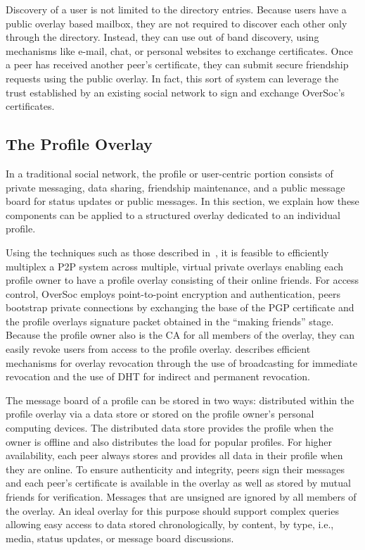 \documentclass{IEEEtran}
\begin{document}
Discovery of a user is not limited to the directory entries.  Because users
have a public overlay based mailbox, they are not required to discover each
other only through the directory.  Instead, they can use out of band discovery,
using mechanisms like e-mail, chat, or personal websites to exchange
certificates.  Once a peer has received another peer's certificate, they can
submit secure friendship requests using the public overlay.  In fact, this sort
of system can leverage the trust established by an existing social network to
sign and exchange OverSoc's certificates.  

\subsection{The Profile Overlay}
\label{profile_overlay}

In a traditional social network, the profile or user-centric portion consists
of private messaging, data sharing, friendship maintenance, and a public
message board for status updates or public messages.  In this section, we
explain how these components can be applied to a structured overlay dedicated
to an individual profile.

Using the techniques such as those described in~\cite{vpo}, it is feasible to
efficiently multiplex a P2P system across multiple, virtual private overlays
enabling each profile owner to have a profile overlay consisting of their
online friends.  For access control, OverSoc employs point-to-point encryption
and authentication, peers bootstrap private connections by exchanging the base
of the PGP certificate and the profile overlays signature packet obtained in
the ``making friends'' stage.  Because the profile owner also is the CA for all
members of the overlay, they can easily revoke users from access to the profile
overlay.  \cite{vpo} describes efficient mechanisms for overlay revocation
through the use of broadcasting for immediate revocation and the use of DHT for
indirect and permanent revocation.

The message board of a profile can be stored in two ways: distributed within
the profile overlay via a data store or stored on the profile owner's personal
computing devices.  The distributed data store provides the profile when the
owner is offline and also distributes the load for popular profiles.  For
higher availability, each peer always stores and provides all data in their
profile when they are online.  To ensure authenticity and integrity, peers sign
their messages and each peer's certificate is available in the overlay as well
as stored by mutual friends for verification.  Messages that are unsigned are
ignored by all members of the overlay.  An ideal overlay for this purpose
should support complex queries~\cite{complex_queries} allowing easy access to
data stored chronologically, by content, by type, i.e., media, status updates,
or message board discussions.
\end{document}
